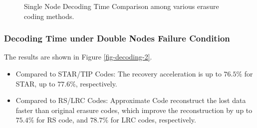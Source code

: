 \documentclass[sigconf]{acmart}
\begin{document}
\begin{figure}[ht]
    \vspace{-0.3cm}
    \caption{Single Node Decoding Time Comparison among various erasure coding methods.}\label{fig-decoding-1}
    \end{figure}

\subsubsection{Decoding Time under Double Nodes Failure Condition}
The results are shown in Figure \ref{fig-decoding-2}.
\begin{itemize}
    \item Compared to STAR/TIP Codes: The recovery acceleration is up to $76.5\%$ for STAR, up to $77.6\%$, respectively.
    \item Compared to RS/LRC Codes: Approximate Code reconstruct the lost data faster than original erasure codes, which improve the reconstruction by up to $75.4\%$ for RS code, and $78.7\%$ for LRC codes, respectively.
\end{itemize}
\end{document}

